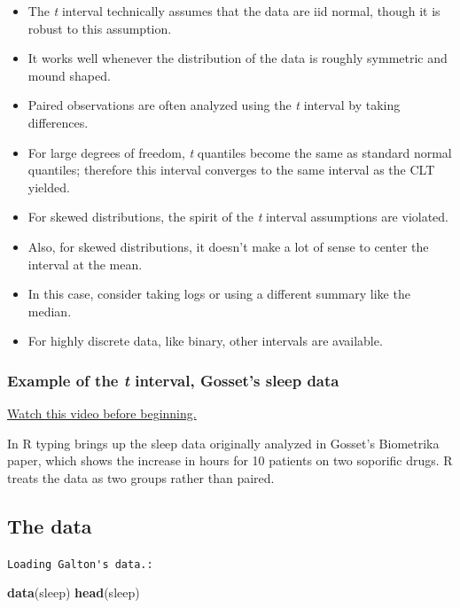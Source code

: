 \documentclass[]{article}
\newenvironment{Shaded}{\begin{snugshade}}{\end{snugshade}}
\newcommand{\KeywordTok}[1]{\textcolor[rgb]{0.13,0.29,0.53}{\textbf{{#1}}}}
\newcommand{\NormalTok}[1]{{#1}}
\begin{document}
\begin{itemize}
\itemsep1pt\parskip0pt
\item
  The \emph{t} interval technically assumes that the data are iid
  normal, though it is robust to this assumption.
\item
  It works well whenever the distribution of the data is roughly
  symmetric and mound shaped.
\item
  Paired observations are often analyzed using the \emph{t} interval by
  taking differences.
\item
  For large degrees of freedom, \emph{t} quantiles become the same as
  standard normal quantiles; therefore this interval converges to the
  same interval as the CLT yielded.
\item
  For skewed distributions, the spirit of the \emph{t} interval
  assumptions are violated.
\item
  Also, for skewed distributions, it doesn't make a lot of sense to
  center the interval at the mean.
\item
  In this case, consider taking logs or using a different summary like
  the median.
\item
  For highly discrete data, like binary, other intervals are available.
\end{itemize}

\subsubsection{Example of the \emph{t} interval, Gosset's sleep
data}\label{example-of-the-t-interval-gossets-sleep-data}

\href{http://youtu.be/2L41xqPvPso?list=PLpl-gQkQivXiBmGyzLrUjzsblmQsLtkzJ}{Watch
this video before beginning.}

In R typing brings up the sleep data originally analyzed in Gosset's
Biometrika paper, which shows the increase in hours for 10 patients on
two soporific drugs. R treats the data as two groups rather than paired.

\subsection{The data}\label{the-data}

\vspace{1pc}

\verb;Loading Galton's data.:;

\begin{Shaded}
\begin{Highlighting}[]
\KeywordTok{data}\NormalTok{(sleep)}
\KeywordTok{head}\NormalTok{(sleep)}
\end{Highlighting}
\end{Shaded}
\end{document}
